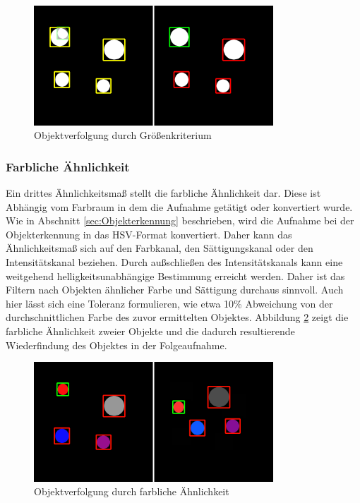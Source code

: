 \begin{figure}[h]
\centering
\includegraphics[width=0.8\textwidth]{Bilder/Workloop/BigObject}
\caption{Objektverfolgung durch Größenkriterium}
\label{fig:GroessenKriterium}
\end{figure}


\subsubsection{Farbliche Ähnlichkeit}
Ein drittes Ähnlichkeitsmaß stellt die farbliche Ähnlichkeit dar. Diese ist Abhängig vom Farbraum in dem die Aufnahme getätigt oder konvertiert wurde. Wie in Abschnitt \ref{sec:Objekterkennung} beschrieben, wird die Aufnahme bei der Objekterkennung in das HSV-Format konvertiert. Daher kann das Ähnlichkeitsmaß sich auf den Farbkanal, den Sättigungskanal oder den Intensitätskanal beziehen. Durch außschließen des Intensitätskanals kann eine weitgehend helligkeitsunabhängige Bestimmung erreicht werden. Daher ist das Filtern nach Objekten ähnlicher Farbe und Sättigung durchaus sinnvoll. Auch hier lässt sich eine Toleranz formulieren, wie etwa 10\% Abweichung von der durchschnittlichen Farbe des zuvor ermittelten Objektes. Abbildung \ref{fig:FarbKriterium} zeigt die farbliche Ähnlichkeit zweier Objekte und die dadurch resultierende Wiederfindung des Objektes in der Folgeaufnahme.

\begin{figure}[h]
\centering
\includegraphics[width=0.8\textwidth]{Bilder/Workloop/ColoredObjects}
\caption{Objektverfolgung durch farbliche Ähnlichkeit}
\label{fig:FarbKriterium}
\end{figure}

